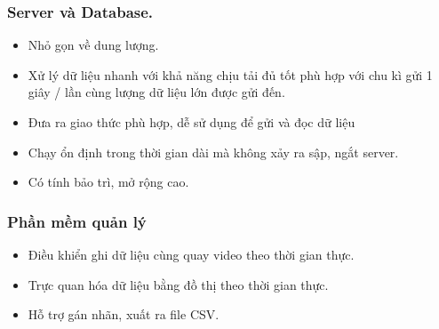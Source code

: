 \documentclass{article}
\begin{document}
\subsubsection{Server và Database.}
\begin{itemize}
    \item Nhỏ gọn về dung lượng. 
    \item Xử lý dữ liệu nhanh với khả năng chịu tải đủ tốt phù hợp với chu kì gửi 1 giây / lần cùng lượng dữ liệu lớn được gửi đến. 
    \item Đưa ra giao thức phù hợp, dễ sử dụng để gửi và đọc dữ liệu
    \item Chạy ổn định trong thời gian dài mà không xảy ra sập, ngắt server. 
    \item Có tính bảo trì, mở rộng cao. 
\end{itemize}
\subsubsection{Phần mềm quản lý }
\begin{itemize}
    \item Điều khiển ghi dữ liệu cùng quay video theo thời gian thực. 
    \item Trực quan hóa dữ liệu bằng đồ thị theo thời gian thực. 
    \item Hỗ trợ gán nhãn, xuất ra file CSV. 
\end{itemize}
\end{document}
